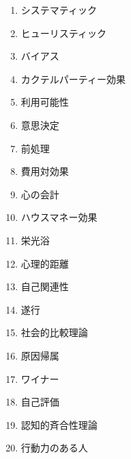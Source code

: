 \documentclass[titlepage,a4paper]{jsarticle}
\begin{document}



\begin{enumerate}
  \item システマティック
  \item ヒューリスティック
  \item バイアス
  \item カクテルパーティー効果
  \item 利用可能性

  \item 意思決定
  \item 前処理
  \item 費用対効果
  \item 心の会計
  \item ハウスマネー効果
  
  \item 栄光浴
  \item 心理的距離
  \item 自己関連性
  \item 遂行
  \item 社会的比較理論
  
  \item 原因帰属
  \item ワイナー
  \item 自己評価
  \item 認知的斉合性理論
  \item 行動力のある人
\end{enumerate}
\end{document}
